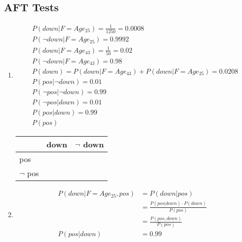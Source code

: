 \documentclass[fleqn,12pt]{scrartcl}
\begin{document}
\subsection{AFT Tests}
\begin{enumerate}
	\item
\begin{align*}
	&P(down | F=Age_{25}) = \frac1{1250} = 0.0008\\
	&P(\neg down | F=Age_{25}) = 0.9992\\
	&P(down | F=Age_{43}) = \frac1{50} = 0.02\\
	&P(\neg down | F=Age_{43}) = 0.98\\
	&P(down) = P(down | F=Age_{43}) + P(down | F=Age_{25}) = 0.0208 \\
	&P(pos | \neg down) = 0.01\\
	&P(\neg pos | \neg down) = 0.99\\
	&P(\neg pos | down) = 0.01\\
	&P(pos | down) = 0.99\\
	&P(pos)
\end{align*}
\begin{tabular}{lcc}
	& down & $\neg$ down \\ \hline
	pos & & \\ \hline
	$\neg$ pos & & 
\end{tabular}
\item
	\begin{align*}
		P(down | F=Age_{25}, pos) &= P(down | pos) \\
																											 &= \frac{P(pos|down)\cdot P(down)}{P(pos)}\\
																											 &= \frac{P(pos, down)}{P(pos)}\\
		P(pos|down) &= 0.99\\
	\end{align*}

\end{enumerate}
\end{document}
